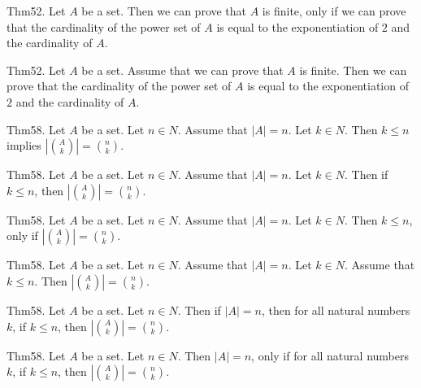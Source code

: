 \documentclass{article}
\begin{document}
Thm52. Let $A$ be a set. Then we can prove that $A$ is finite, only if we can prove that the cardinality of the power set of $A$ is equal to the exponentiation of $2$ and the cardinality of $A$.

Thm52. Let $A$ be a set. Assume that we can prove that $A$ is finite. Then we can prove that the cardinality of the power set of $A$ is equal to the exponentiation of $2$ and the cardinality of $A$.

Thm58. Let $A$ be a set. Let $n \in N$. Assume that $| A | = n$. Let $k \in N$. Then $k \leq n$ implies $| \binom{ A }{ k}| = \binom{ n }{ k}$.

Thm58. Let $A$ be a set. Let $n \in N$. Assume that $| A | = n$. Let $k \in N$. Then if $k \leq n$, then $| \binom{ A }{ k}| = \binom{ n }{ k}$.

Thm58. Let $A$ be a set. Let $n \in N$. Assume that $| A | = n$. Let $k \in N$. Then $k \leq n$, only if $| \binom{ A }{ k}| = \binom{ n }{ k}$.

Thm58. Let $A$ be a set. Let $n \in N$. Assume that $| A | = n$. Let $k \in N$. Assume that $k \leq n$. Then $| \binom{ A }{ k}| = \binom{ n }{ k}$.

Thm58. Let $A$ be a set. Let $n \in N$. Then if $| A | = n$, then for all natural numbers $k$, if $k \leq n$, then $| \binom{ A }{ k}| = \binom{ n }{ k}$.

Thm58. Let $A$ be a set. Let $n \in N$. Then $| A | = n$, only if for all natural numbers $k$, if $k \leq n$, then $| \binom{ A }{ k}| = \binom{ n }{ k}$.
\end{document}
